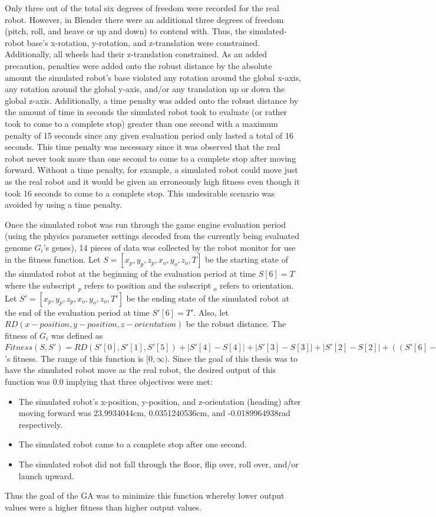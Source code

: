 Only three out of the total six degrees of freedom were recorded for the real robot. However, in Blender there were an additional three degrees of freedom (pitch, roll, and heave or up and down) to contend with. Thus, the simulated-robot base's x-rotation, y-rotation, and z-translation were constrained. Additionally, all wheels had their z-translation constrained. As an added precaution, penalties were added onto the robust distance by the absolute amount the simulated robot's base violated any rotation around the global x-axis, any rotation around the global y-axis, and/or any translation up or down the global z-axis. Additionally, a time penalty was added onto the robust distance by the amount of time in seconds the simulated robot took to evaluate (or rather took to come to a complete stop) greater than one second with a maximum penalty of 15 seconds since any given evaluation period only lasted a total of 16 seconds. This time penalty was necessary since it was observed that the real robot never took more than one second to come to a complete stop after moving forward. Without a time penalty, for example, a simulated robot could move just as the real robot and it would be given an erroneously high fitness even though it took 16 seconds to come to a complete stop. This undesirable scenario was avoided by using a time penalty.     

Once the simulated robot was run through the game engine evaluation period (using the physics parameter settings decoded from the currently being evaluated genome $G_i$'s genes), 14 pieces of data was collected by the robot monitor for use in the fitness function. Let $S=[x_p,y_p,z_p,x_o,y_o,z_o,T]$ be the starting state of the simulated robot at the beginning of the evaluation period at time $S[6]=T$ where the subscript $_p$ refers to position and the subscript $_o$ refers to orientation. Let $S'=[x_p,y_p,z_p,x_o,y_o,z_o,T']$ be the ending state of the simulated robot at the end of the evaluation period at time $S'[6]=T'$. Also, let $RD(x-position,y-position,z-orientation)$ be the robust distance. The fitness of $G_i$ was defined as $Fitness(S,S')=RD(S'[0],S'[1],S'[5])+|S'[4]-S[4]|+|S'[3]-S[3]|+|S'[2]-S[2]|+((S'[6]-S[6])-1)=G_i$'s fitness. The range of this function is $[0,\infty)$. Since the goal of this thesis was to have the simulated robot move as the real robot, the desired output of this function was $0.0$ implying that three objectives were met:
\begin{itemize}
 \item The simulated robot's x-position, y-position, and z-orientation (heading) after moving forward was 23.9934044cm, 0.0351240536cm, and -0.0189964938rad respectively.
 \item The simulated robot came to a complete stop after one second.
 \item The simulated robot did not fall through the floor, flip over, roll over, and/or launch upward.
\end{itemize}
Thus the goal of the GA was to minimize this function whereby lower output values were a higher fitness than higher output values.

